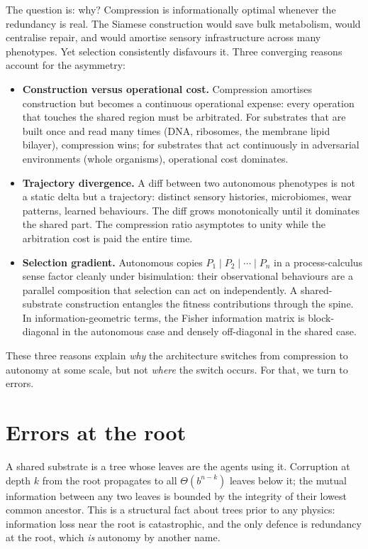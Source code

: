 \documentclass[11pt]{article}
\begin{document}
The question is: why? Compression is informationally optimal whenever the redundancy is real. The Siamese construction would save bulk metabolism, would centralise repair, and would amortise sensory infrastructure across many phenotypes. Yet selection consistently disfavours it. Three converging reasons account for the asymmetry:
\begin{itemize}[itemsep=2pt,topsep=2pt]
\item \textbf{Construction versus operational cost.} Compression amortises construction but becomes a continuous operational expense: every operation that touches the shared region must be arbitrated. For substrates that are built once and read many times (DNA, ribosomes, the membrane lipid bilayer), compression wins; for substrates that act continuously in adversarial environments (whole organisms), operational cost dominates.
\item \textbf{Trajectory divergence.} A diff between two autonomous phenotypes is not a static delta but a trajectory: distinct sensory histories, microbiomes, wear patterns, learned behaviours. The diff grows monotonically until it dominates the shared part. The compression ratio asymptotes to unity while the arbitration cost is paid the entire time.
\item \textbf{Selection gradient.} Autonomous copies $P_1 \mid P_2 \mid \cdots \mid P_n$ in a process-calculus sense factor cleanly under bisimulation: their observational behaviours are a parallel composition that selection can act on independently. A shared-substrate construction entangles the fitness contributions through the spine. In information-geometric terms, the Fisher information matrix is block-diagonal in the autonomous case and densely off-diagonal in the shared case.
\end{itemize}

These three reasons explain \emph{why} the architecture switches from compression to autonomy at some scale, but not \emph{where} the switch occurs. For that, we turn to errors.

\section{Errors at the root}

A shared substrate is a tree whose leaves are the agents using it. Corruption at depth $k$ from the root propagates to all $\Theta(b^{n-k})$ leaves below it; the mutual information between any two leaves is bounded by the integrity of their lowest common ancestor. This is a structural fact about trees prior to any physics: information loss near the root is catastrophic, and the only defence is redundancy at the root, which \emph{is} autonomy by another name.
\end{document}
